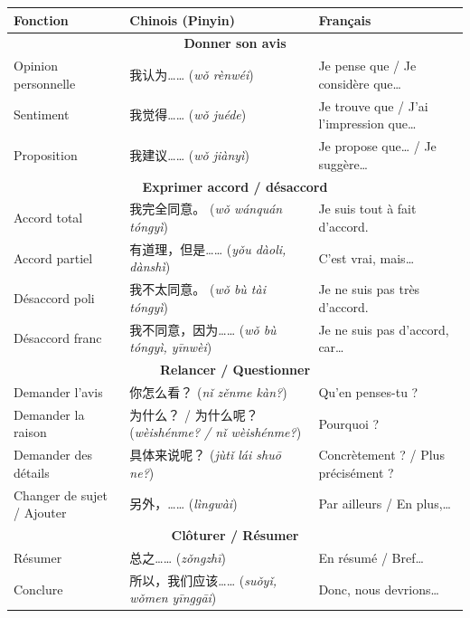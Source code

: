 \documentclass[11pt]{article}
\begin{document}
\begin{center}
\begin{tabularx}{\linewidth}{|X|X|X|}
\hline
\rowcolor{popblueL} Fonction & Chinois (Pinyin) & Français \\
\hline
\multicolumn{3}{|c|}{\textbf{Donner son avis}} \\ \hline
Opinion personnelle & 我认为…… (\emph{wǒ rènwéi}) & Je pense que / Je considère que… \\
Sentiment & 我觉得…… (\emph{wǒ juéde}) & Je trouve que / J'ai l'impression que… \\
Proposition & 我建议…… (\emph{wǒ jiànyì}) & Je propose que… / Je suggère… \\
\hline
\multicolumn{3}{|c|}{\textbf{Exprimer accord / désaccord}} \\ \hline
Accord total & 我完全同意。 (\emph{wǒ wánquán tóngyì}) & Je suis tout à fait d'accord. \\
Accord partiel & 有道理，但是…… (\emph{yǒu dàoli, dànshì}) & C'est vrai, mais… \\
Désaccord poli & 我不太同意。 (\emph{wǒ bù tài tóngyì}) & Je ne suis pas très d'accord. \\
Désaccord franc & 我不同意，因为…… (\emph{wǒ bù tóngyì, yīnwèi}) & Je ne suis pas d'accord, car… \\
\hline
\multicolumn{3}{|c|}{\textbf{Relancer / Questionner}} \\ \hline
Demander l'avis & 你怎么看？ (\emph{nǐ zěnme kàn?}) & Qu'en penses-tu ? \\
Demander la raison & 为什么？ / 为什么呢？ (\emph{wèishénme? / nǐ wèishénme?}) & Pourquoi ? \\
Demander des détails & 具体来说呢？ (\emph{jùtǐ lái shuō ne?}) & Concrètement ? / Plus précisément ? \\
Changer de sujet / Ajouter & 另外，…… (\emph{lìngwài}) & Par ailleurs / En plus,… \\
\hline
\multicolumn{3}{|c|}{\textbf{Clôturer / Résumer}} \\ \hline
Résumer & 总之…… (\emph{zǒngzhī}) & En résumé / Bref… \\
Conclure & 所以，我们应该…… (\emph{suǒyǐ, wǒmen yīnggāi}) & Donc, nous devrions… \\
\end{tabularx}
\end{center}
\end{document}
